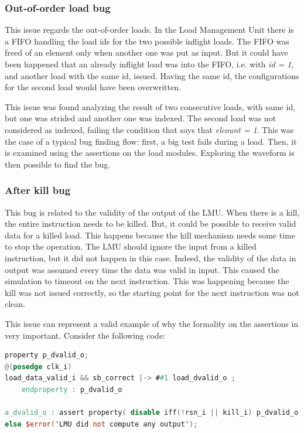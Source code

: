 \subsubsection{Out-of-order load bug}
This issue regards the out-of-order loads. In the Load Management Unit there is a FIFO handling the load ids for the two possible inflight loads.
The FIFO was freed of an element only when another one was put as input. But it could have been happened that an already inflight load was into the FIFO, i.e. with \emph{id = 1}, and another load with the same id, issued.
Having the same id, the configurations for the second load would have been overwritten.

This issue was found analyzing the result of two consecutive loads, with same id, but one was strided and another one was indexed. The second load was not considered as indexed, failing the condition that says that \emph{el\+count = 1}.
This was the case of a typical bug finding flow: first, a big test fails during a load. Then, it is examined using the assertions on the load modules. Exploring the waveform is then possible to find the bug.

\subsubsection{After kill bug}
This bug is related to the validity of the output of the LMU.
When there is a kill, the entire instruction needs to be killed. But, it could be possible to receive valid data for a killed load. This happens because the kill mechanism needs some time to stop the operation.
The LMU should ignore the input from a killed instruction, but it did not happen in this case. Indeed, the validity of the data in output was assumed every time the data was valid in input.
This caused the simulation to timeout on the next instruction. This was happening because the kill was not issued correctly, so the starting point for the next instruction was not clean.

This issue can represent a valid example of why the formality on the assertions in very important.
Consider the following code:


\linespread{1}
\begin{lstlisting}[language=Verilog,style=verilog-style, backgroundcolor=\color{lyel_palette}, frame=tlb]
property p_dvalid_o;
@(posedge clk_i)
load_data_valid_i && sb_correct |-> ##1 load_dvalid_o ;
	endproperty : p_dvalid_o

a_dvalid_o : assert property( disable iff(!rsn_i || kill_i) p_dvalid_o )
else $error('LMU did not compute any output');
\end{lstlisting}
\linespread{1.2}

